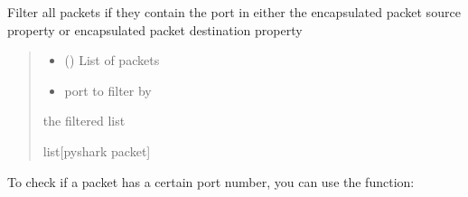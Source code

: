 \documentclass[letterpaper,10pt,english,openany,oneside]{sphinxmanual}
\begin{document}
\begin{fulllineitems}
\label{\detokenize{index:pktsniffer.filter_by_port}}
\pysigstartsignatures
\pysiglinewithargsret
{}
{\sphinxparamcomma {}}
{}
\pysigstopsignatures
\sphinxAtStartPar
Filter all packets if they contain the port in either the
encapsulated packet source property or encapsulated packet
destination property
\begin{quote}\begin{description}
\begin{itemize}
\item {} 
\sphinxAtStartPar
{} (\sphinxstyleliteralemphasis{\sphinxupquote{{[}}}\sphinxstyleliteralemphasis{\sphinxupquote{{]}}}) \textendash{} List of packets

\item {} 
\sphinxAtStartPar
{} \textendash{} port to filter by

\end{itemize}

\sphinxAtStartPar
the filtered list

\sphinxAtStartPar
list{[}pyshark packet{]}

\end{description}\end{quote}

\end{fulllineitems}


\sphinxAtStartPar
To check if a packet has a certain port number, you can
use the  function:
\end{document}
